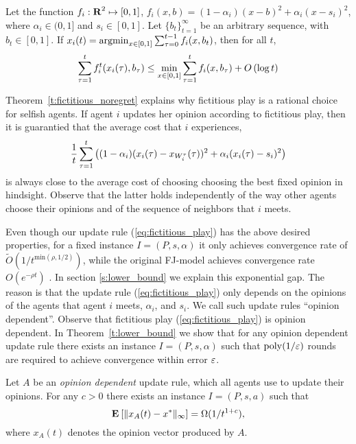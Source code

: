 \begin{theorem}\label{t:fictitious_noregret}
Let the function $f_i:\bm{\mathrm{R}}^2 \mapsto [0,1]$,
$f_i(x,b) = (1-\alpha_i)(x-b)^2 + \alpha_i(x-s_i)^2$, where $\alpha_i \in (0,1]$ and $s_i \in [0,1]$.
Let $\{b_t\}_{t=1}^\infty$ be an arbitrary sequence, with $b_t \in [0,1]$.
If \(x_i(t) = \operatorname*{argmin}_{x \in [0,1]}\sum_{\tau=0}^{t-1}f_i(x,b_t)\),
then for all $t$,
\[\sum_{\tau=1}^tf_i^t(x_i(\tau),b_\tau) \leq \min_{x \in [0,1]}\sum_{\tau=1}^tf_i(x,b_\tau) + O\left(\log t\right)\]
\end{theorem}
Theorem~\ref{t:fictitious_noregret} explains why fictitious play
is a rational choice for selfish agents. If agent $i$ updates her
opinion according to fictitious play, then it is guarantied
that the average cost that $i$ experiences,
\[
  \frac{1}{t}\sum_{\tau=1}^t
  \left(
  (1-\alpha_i) (x_i(\tau) - x_{W_i^{\tau}}(\tau))^2 + \alpha_i (x_i(\tau) - s_i)^2
  \right)
\]
is always close to the average cost of choosing choosing the best fixed opinion in hindsight.
Observe that the latter holds independently of the way other agents
choose their opinions and of the sequence of neighbors that $i$ meets.

Even though our update rule (\ref{eq:fictitious_play}) has the above
desired properties, for a fixed instance $I=(P,s,\alpha)$ it only achieves convergence rate of
$\widetilde{O}(1/t^{\text{min}(\rho,1/2)})$, while the original FJ-model
achieves convergence rate $O(e^{-\rho t})$ \cite{GS14}.
In section \ref{s:lower_bound} we explain this exponential gap.
The reason is that the update rule (\ref{eq:fictitious_play})
only depends on the opinions of the agents that agent $i$ meets,
$\alpha_i$, and $s_i$. We call such update rules \enquote{opinion dependent}.
Observe that fictitious play (\ref{eq:fictitious_play}) is opinion dependent.
  In Theorem~\ref{t:lower_bound} we
show that for any opinion dependent update rule there exists an instance
$I = (P,s,\alpha)$ such that $\mathrm{poly}(1/\varepsilon)$ rounds are required to
achieve convergence within error $\varepsilon$.
\begin{theorem}\label{t:lower_bound}
  Let $A$ be an \emph{opinion dependent} update rule, which all
  agents use to update their opinions.
  For any $c>0$ there exists an instance $I=(P,s,a)$ such that
  \[
    \Exp{\norm{\infty}{x_A(t) - x^*}} = \Omega(1/t^{1+c}),
  \]
where $x_A(t)$ denotes the opinion vector produced by $A$.
\end{theorem}

